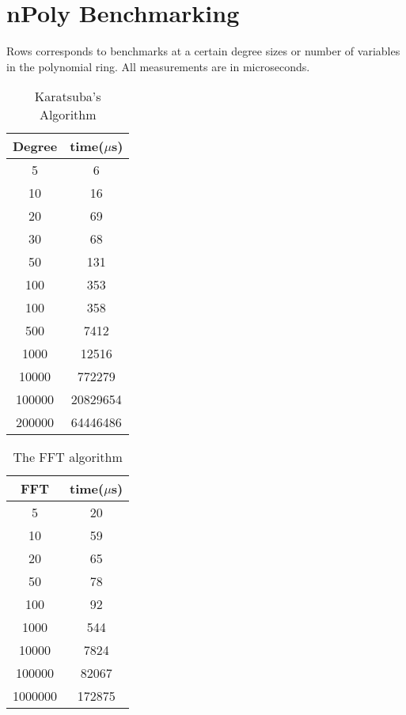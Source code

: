 \chapter{nPoly Benchmarking}
\label{appendix1}

Rows corresponds to benchmarks at a certain degree sizes or number of variables in the polynomial ring. All measurements are in microseconds.

\begin{table}[h]
\centering
    \begin{tabular}{|c| c |}
        \hline
        Degree & time($\mu$s)\\
        \hline
        5 & 6 \\
        10 & 16 \\
        20 & 69\\
        30 & 68\\
        50 & 131 \\
        100 & 353 \\
        100 & 358\\
        500 & 7412 \\
        1000 & 12516\\
        10000 & 772279\\
        100000 & 20829654\\
        200000 & 64446486\\
        \hline
    \end{tabular}
    \caption{Karatsuba's Algorithm}
\end{table}

\begin{table}[h]
\centering
    \begin{tabular}{|c| c |}
        \hline
        FFT & time($\mu$s)\\
        \hline
        5 & 20\\
        10 & 59\\
        20 & 65\\
        50 & 78\\
        100 & 92\\
        1000 & 544\\
        10000 & 7824\\
        100000 & 82067\\
        1000000 & 172875\\
        \hline
    \end{tabular}
    \caption{The FFT algorithm}
\end{table}

